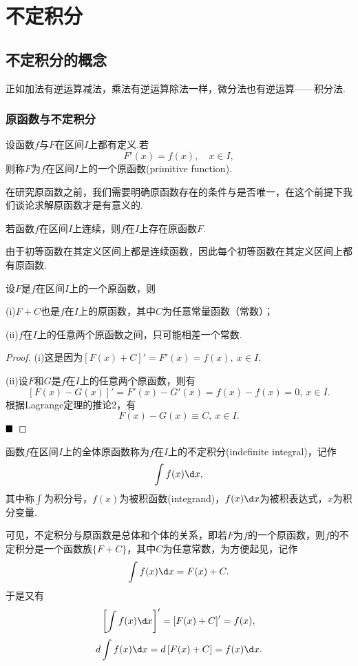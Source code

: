 \chapter{不定积分}
\section{不定积分的概念}
正如加法有逆运算减法，乘法有逆运算除法一样，微分法也有逆运算——积分法.
\subsection{原函数与不定积分}
\begin{definition}[原函数]
	设函数$f$与$F$在区间$I$上都有定义.若
	$$F'(x)=f(x),\quad x\in I,$$
	则称$F$为$f$在区间$I$上的一个{\heiti 原函数}(primitive function).
\end{definition}
在研究原函数之前，我们需要明确原函数存在的条件与是否唯一，在这个前提下我们谈论求解原函数才是有意义的.
\begin{theorem}[原函数存在定理（待证）]
	若函数$f$在区间$I$上连续，则$f$在$I$上存在原函数$F$.
\end{theorem}
由于初等函数在其定义区间上都是连续函数，因此每个初等函数在其定义区间上都有原函数.
\begin{theorem}
	设$F$是$f$在区间$I$上的一个原函数，则
	
	(i)$F+C$也是$f$在$I$上的原函数，其中$C$为任意常量函数（常数）；
	
	(ii)$f$在$I$上的任意两个原函数之间，只可能相差一个常数.
\end{theorem}
\begin{proof}
	(i)这是因为$\left[F(x)+C\right]'=F'(x)=f(x),\ x\in I$.
	
	(ii)设$F$和$G$是$f$在$I$上的任意两个原函数，则有
	$$\left[F(x)-G(x)\right]'=F'(x)-G'(x)=f(x)-f(x)=0,\ x\in I.$$
	根据Lagrange定理的推论2，有$$F(x)-G(x)\equiv C,\ x\in I.$$
	$\hfill\blacksquare$
\end{proof}
\begin{definition}[不定积分]
	函数$f$在区间$I$上的全体原函数称为$f$在$I$上的{\heiti 不定积分}(indefinite integral)，记作
	$$\int f(x)\d x,$$
	其中称$\int$为积分号，$f(x)$为{\heiti 被积函数}(integrand)，$f(x)\d x$为{\heiti 被积表达式}，$x$为{\heiti 积分变量}.
\end{definition}
可见，不定积分与原函数是总体和个体的关系，即若$F$为$f$的一个原函数，则$f$的不定积分是一个函数族$\{F+C\}$，其中$C$为任意常数，为方便起见，记作
$$\int f(x)\d x=F(x)+C.$$
于是又有
$$\left[\int f(x)\d x\right]'=\left[F(x)+C\right]'=f(x),$$
$$d\int f(x)\d x=d\left[F(x)+C\right]=f(x)\d x.$$

